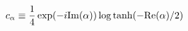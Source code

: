 \begin{equation}
  \label{eq:free9}
    c_\alpha \equiv \frac{1}{4}\exp(-i{\rm Im}(\alpha))\log \tanh(-{\rm Re}(\alpha)/2)
\end{equation}

